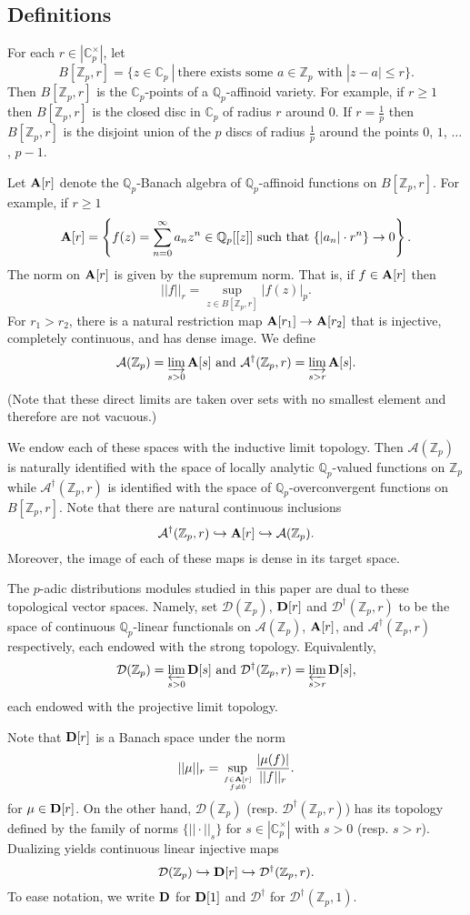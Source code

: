 \documentclass{amsart}
\theoremstyle{plain}
\theoremstyle{definition}
\newcommand{\A}{{\mathcal A}}
\newcommand{\bA}{{\bf A}}
\newcommand{\D}{{\mathcal D}}
\newcommand{\bD}{{\bf D}}
\newcommand{\Z}{{\mathbb Z}}
\newcommand{\Q}{{\mathbb Q}}
\newcommand{\C}{{\mathbb C}}
\newcommand{\Zp}{\Z_p}
\newcommand{\Qp}{\Q_p}
\newcommand{\Cp}{\C_p}
\newcommand{\inj}{\hookrightarrow}
\newcommand{\maps}{\rightarrow}
\newcommand{\Arigv}[1]{\bA[#1]}
\newcommand{\Drigv}[1]{\bD[#1]}
\newcommand{\Drig}{\bD}
\newcommand{\Aocv}[1]{\A^\dag(\Zp,#1)}
\newcommand{\Docv}[1]{\D^\dag(\Zp,#1)}
\newcommand{\Dkocv}[1]{\D^\dag(\Zp,#1)}
\newcommand{\Doc}{\D^\dag}
\newcommand{\Ala}{\A(\Zp)}
\newcommand{\Dla}{\D(\Zp)}
\begin{document}
\subsection{Definitions}

For each $r \in |\Cp^\times|$, let
$$
B[\Zp,r] = \{ z \in \Cp ~|~ \text{there~exists~some~} a \in \Zp \text{~with~}
|z-a| \leq r \}.
$$
Then $B[\Zp,r]$ is the $\Cp$-points of a $\Qp$-affinoid variety.  For example, if $r \geq 1$ then $B[\Zp,r]$ is the closed disc in $\Cp$ of radius $r$ around 0. If $r = \frac{1}{p}$ then $B[\Zp,r]$ is the disjoint union of the $p$ discs of radius $\frac{1}{p}$ around the points $0$, $1$, $\dots$ , $p-1$.

Let $\Arigv{r}$ denote the $\Qp$-Banach algebra of $\Qp$-affinoid functions on $B[\Zp,r]$.  For example, if $r\geq 1$
$$
\Arigv{r} = \left\{  f(z) = \sum_{n=0}^\infty a_n z^n \in \Qp[[z]]
\text{~such~that~} \{ |a_n| \cdot r^n \} \maps 0 \right\}.
$$
The norm on $\Arigv{r}$ is given by the supremum norm.  That is, if $f \in \Arigv{r}$ then
$$
||f||_r = \sup_{z \in B[\Zp,r]} |f(z)|_p.
$$
For $r_1>r_2$, there is a natural restriction map $\Arigv{r_1} \maps \Arigv{r_2}$
that is injective, completely continuous, and has dense image.  We define
$$
\Ala = \varinjlim_{s>0} \Arigv{s} \text{~and~} \Aocv{r} =
\varinjlim_{s>r} \Arigv{s}.
$$
(Note that these direct limits are taken over sets with no smallest element and therefore are not vacuous.)  

We endow each of these spaces with the inductive limit topology.  Then $\Ala$ is naturally identified with the space of locally analytic $\Qp$-valued
functions on $\Zp$ while $\Aocv{r}$ is identified with the space of $\Qp$-overconvergent functions on $B[\Zp,r]$.   Note that there are natural continuous inclusions
$$
\Aocv{r} \inj \Arigv{r} \inj \Ala.
$$
Moreover, the image of each of these maps is dense in its target space.

The $p$-adic distributions modules studied in this paper are dual to these topological vector spaces. Namely, set $\Dla$, $\Drigv{r}$ and $\Dkocv{r}$ to be the space of continuous $\Qp$-linear functionals on $\Ala$,
$\Arigv{r}$,
and $\Aocv{r}$ respectively, each endowed with the strong topology.
Equivalently,
$$
\Dla = \varprojlim_{s>0} \Drigv{s} \text{~and~} \Dkocv{r} =
\varprojlim_{s>r} \Drigv{s},
$$
each endowed with the projective limit topology.

Note that $\Drigv{r}$ is a Banach space under the norm
$$
||\mu||_{r} = \sup_{\genfrac{}{}{0pt}{}{f \in \Arigv{r}}{f \neq 0}}
\frac{|\mu(f)|}{||f||_{r}}.
$$
for $\mu \in \Drigv{r}$.
On the other hand, $\Dla$  (resp. $\Dkocv{r}$)
has its topology defined by the family of norms $\{ || \cdot ||_s\}$
for $s \in |\Cp^\times|$ with $s>0$ (resp. $s>r$).
Dualizing yields continuous linear injective maps
$$
\Dla \inj \Drigv{r} \inj \Dkocv{r}.
$$
To ease notation, we write $\Drig$ for $\Drigv{1}$ and $\Doc$ for $\Docv{1}$.
\end{document}

